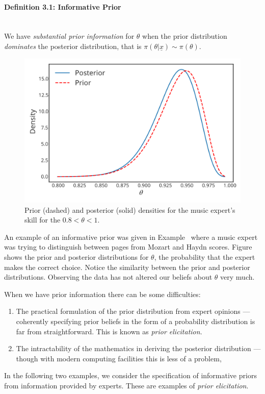 \paragraph{Definition 3.1: Informative Prior}{~\\
We have \emph{substantial prior information} for $\theta$ when the prior distribution {\it dominates} the posterior distribution, that is
$\pi(\theta|\underline{x})\sim\pi(\theta)$.}
\begin{figure}[h!]

\includegraphics{images/priorposterior1.svg}
\caption{Prior (dashed) and posterior (solid) densities for the music expert's skill for the $0.8 < \theta < 1$.}
\label{fig:substantial}

\end{figure}
An example of  an informative prior was given in Example~ where a music expert was trying to distinguish between pages from Mozart and Haydn scores. Figure~ shows the prior and posterior distributions for $\theta$, the probability that the expert makes the correct choice. Notice the similarity between the prior and posterior distributions. Observing the data has not altered our beliefs about $\theta$ very much.

When we have prior information there can be some difficulties:
\begin{enumerate}
\item The practical formulation of the prior distribution from expert opinions ---
coherently specifying prior beliefs in the form of a probability
distribution is far from straightforward. This is known as \emph{prior elicitation}.
\item The intractability of the mathematics in deriving the posterior
distribution --- though with modern computing facilities this is less
of a problem,
\end{enumerate}
In the following two examples, we consider the specification of informative priors from information provided by experts. These are examples of \emph{prior elicitation}.
\clearpage


